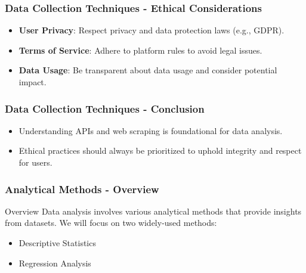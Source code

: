 \documentclass{beamer}
\begin{document}
\begin{frame}[fragile]
    \frametitle{Data Collection Techniques - Ethical Considerations}
    \begin{itemize}
        \item \textbf{User Privacy}: Respect privacy and data protection laws (e.g., GDPR).
        \item \textbf{Terms of Service}: Adhere to platform rules to avoid legal issues.
        \item \textbf{Data Usage}: Be transparent about data usage and consider potential impact.
    \end{itemize}
\end{frame}

\begin{frame}[fragile]
    \frametitle{Data Collection Techniques - Conclusion}
    \begin{itemize}
        \item Understanding APIs and web scraping is foundational for data analysis.
        \item Ethical practices should always be prioritized to uphold integrity and respect for users.
    \end{itemize}
\end{frame}

\begin{frame}[fragile]
    \frametitle{Analytical Methods - Overview}
    \begin{block}{Overview}
        Data analysis involves various analytical methods that provide insights from datasets. We will focus on two widely-used methods:
        \begin{itemize}
            \item Descriptive Statistics
            \item Regression Analysis
        \end{itemize}
    \end{block}
\end{frame}
\end{document}
